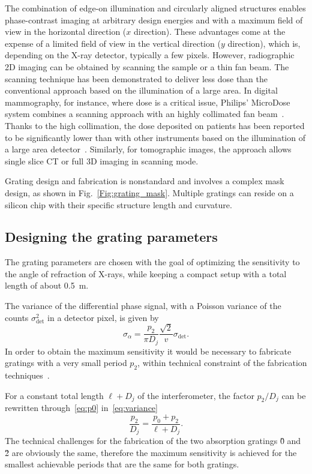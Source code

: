 The combination of edge-on illumination and circularly aligned structures
enables phase-contrast imaging at arbitrary design energies and with a
maximum field of view in the horizontal direction ($x$ direction). These
advantages come at the expense of a limited field of view in the vertical
direction ($y$ direction), which is, depending on the X-ray detector,
typically a few pixels. However, radiographic 2D imaging can be obtained by
scanning the sample or a thin fan beam. The scanning technique has been
demonstrated to deliver less dose than the conventional approach based on
the illumination of a large area. In digital mammography, for instance,
where dose is a critical issue, Philips' MicroDose system combines a
scanning approach with an highly collimated fan beam~\cite{Aslund2007}.
Thanks to the high collimation, the dose deposited on  patients has been
reported to be significantly lower than with other instruments based on the
illumination of a large area detector~\cite{Oduko2010}. Similarly, for
tomographic images, the approach allows single slice \ac{CT} or full 3D
imaging in scanning mode.

Grating design and fabrication is nonstandard and involves a complex mask
design, as shown in Fig.~\ref{Fig:grating_mask}. Multiple gratings can
reside on a silicon chip with their specific structure length and curvature.

\subsection{Designing the grating parameters}
The grating parameters are chosen with the goal of optimizing the
sensitivity to the angle of refraction of X-rays, while keeping a compact
setup with a total length of about \SI{0.5}{\meter}.

The variance of the differential phase signal, with a Poisson variance of
the counts $\sigma_{\text{det}}^2$ in a detector pixel, is given by~\cite{Raupach2011}
\begin{equation}
    \sigma_\alpha = \frac{p_2}{\pi D_j}
    \frac{\sqrt{2}}{v}\sigma_{\text{det}}.\label{eq:variance}
\end{equation}
In order to obtain the maximum sensitivity it would be necessary to
fabricate gratings with a very small period
$p_2$, within technical constraint of the fabrication
techniques~\cite{David2007,Kenntner2010}.

For a constant total length $\ell + D_j$ of the interferometer, the factor
$p_2/D_j$ can be rewritten through~\eqref{eq:p0} in~\eqref{eq:variance}
\begin{equation}
    \frac{p_2}{D_j} = \frac{p_0 + p_2}{\ell + D_j}.
\end{equation}
The technical challenges for the fabrication of the two absorption gratings
\G0 and \G2 are obviously the same, therefore the maximum sensitivity is
achieved for the smallest achievable periods that are the same for both
gratings.

